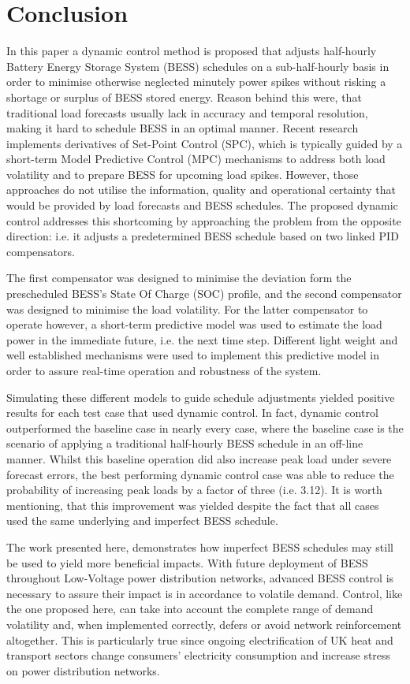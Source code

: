 \section{Conclusion}
\label{ch2:sec:conclusion}

In this paper a dynamic control method is proposed that adjusts half-hourly Battery Energy Storage System (BESS) schedules on a sub-half-hourly basis in order to minimise otherwise neglected minutely power spikes without risking a shortage or surplus of BESS stored energy.
Reason behind this were, that traditional load forecasts usually lack in accuracy and temporal resolution, making it hard to schedule BESS in an optimal manner.
Recent research implements derivatives of Set-Point Control (SPC), which is typically guided by a short-term Model Predictive Control (MPC) mechanisms to address both load volatility and to prepare BESS for upcoming load spikes.
However, those approaches do not utilise the information, quality and operational certainty that would be provided by load forecasts and BESS schedules.
The proposed dynamic control addresses this shortcoming by approaching the problem from the opposite direction: i.e. it adjusts a predetermined BESS schedule based on two linked PID compensators.

The first compensator was designed to minimise the deviation form the prescheduled BESS's State Of Charge (SOC) profile, and the second compensator was designed to minimise the load volatility.
For the latter compensator to operate however, a short-term predictive model was used to estimate the load power in the immediate future, i.e. the next time step.
Different light weight and well established mechanisms were used to implement this predictive model in order to assure real-time operation and robustness of the system.

Simulating these different models to guide schedule adjustments yielded positive results for each test case that used dynamic control.
In fact, dynamic control outperformed the baseline case in nearly every case, where the baseline case is the scenario of applying a traditional half-hourly BESS schedule in an off-line manner.
Whilst this baseline operation did also increase peak load under severe forecast errors, the best performing dynamic control case was able to reduce the probability of increasing peak loads by a factor of three (i.e. 3.12).
It is worth mentioning, that this improvement was yielded despite the fact that all cases used the same underlying and imperfect BESS schedule.

The work presented here, demonstrates how imperfect BESS schedules may still be used to yield more beneficial impacts.
With future deployment of BESS throughout Low-Voltage power distribution networks, advanced BESS control is necessary to assure their impact is in accordance to volatile demand.
Control, like the one proposed here, can take into account the complete range of demand volatility and, when implemented correctly, defers or avoid network reinforcement altogether.
This is particularly true since ongoing electrification of UK heat and transport sectors change consumers' electricity consumption and increase stress on power distribution networks.